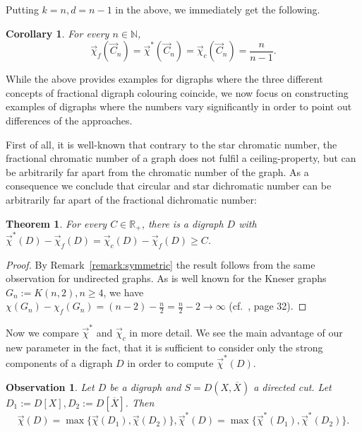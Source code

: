 \documentclass[fontsize=11pt,a4paper,DIV12]{scrartcl}
\def\n{\par\noindent}
\theoremstyle{meiner}
\newtheorem{theorem}{Theorem}
\newtheorem{corollary}{Corollary}
\newtheorem{observation}{Observation}
\theoremstyle{definition}
\begin{document}
Putting $k=n, d=n-1$ in the above, we immediately get the following.
\begin{corollary} \label{circles}
For every $n \in \mathbb{N}$,
$$\vec{\chi}_f(\vec{C}_n)=\vec{\chi}^\ast(\vec{C}_n)=\vec{\chi}_c(\vec{C}_n)=\frac{n}{n-1}.$$
\end{corollary}
While the above provides examples for digraphs where the three different concepts of fractional digraph colouring coincide, we now focus on constructing examples of digraphs where the numbers vary significantly in order to point out differences of the approaches. \n
First of all, it is well-known that contrary to the star chromatic number, the fractional chromatic number of a graph does not fulfil a ceiling-property, but can be arbitrarily far apart from the chromatic number of the graph. As a consequence we conclude that circular and star dichromatic number can be arbitrarily far apart of the fractional dichromatic number:
\begin{theorem}
  For every $C \in \mathbb{R}_+$, there is a digraph $D$ with
  $\vec{\chi}^\ast(D)-\vec{\chi}_f(D) =
  \vec{\chi}_c(D)-\vec{\chi}_f(D) \ge C$.
\end{theorem}
\begin{proof}
  By Remark~\ref{remark:symmetric} the result follows from the same
  observation for undirected graphs. As is well known for the Kneser
  graphs $G_n:=K(n,2), n \ge 4$, we have $\chi(G_n)-\chi
  _f(G_n)=(n-2)-\frac{n}{2}=\frac{n}{2}-2 \rightarrow \infty$ (cf.\
  \cite{kneser}, page 32).
\end{proof}

Now we compare $\vec{\chi}^\ast$ and $\vec{\chi}_c$ in more detail. We
see the main advantage of our new parameter in the fact, that it is
sufficient to consider only the strong components of a digraph $D$ in
order to compute $\vec{\chi}^\ast(D)$. 
\begin{observation} \label{CutVerbinden}
Let $D$ be a digraph and $S=D(X,\overline{X})$ a directed cut. Let $D_1:=D[X], D_2:=D[\overline{X}]$. Then 
$$\vec{\chi}(D)=\max\{\vec{\chi}(D_1),\vec{\chi}(D_2)\}, \vec{\chi}^\ast(D)=\max\{\vec{\chi}^\ast(D_1),\vec{\chi}^\ast(D_2)\}.$$
\end{observation}
\end{document}
